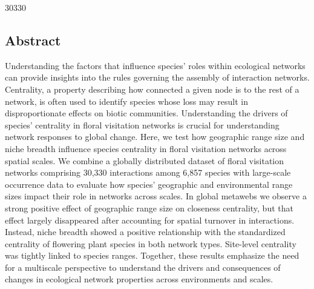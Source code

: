 \documentclass[12pt]{article}
\begin{document}
\clearpage

\linenumbers







30330

\subsection{Abstract}
Understanding the factors that influence species' roles within ecological networks can provide insights into the rules governing the assembly of interaction networks. Centrality, a property describing how connected a given node is to the rest of a network, is often used to identify species whose loss may result in disproportionate effects on biotic communities. Understanding the drivers of species' centrality in floral visitation networks is crucial for understanding network responses to global change. Here, we test how geographic range size and niche breadth influence species centrality in floral visitation networks across spatial scales. We combine a globally distributed dataset of floral visitation networks comprising 30,330 interactions among 6,857 species with large-scale occurrence data to evaluate how species’ geographic and environmental range sizes impact their role in networks across scales. In global metawebs we observe a strong positive effect of geographic range size on closeness centrality, but that effect largely disappeared after accounting for spatial turnover in interactions. Instead, niche breadth showed a positive relationship with the standardized centrality of flowering plant species in both network types. Site-level centrality was tightly linked to species ranges. Together, these results emphasize the need for a multiscale perspective to understand the drivers and consequences of changes in ecological network properties across environments and scales. 
\end{document}
